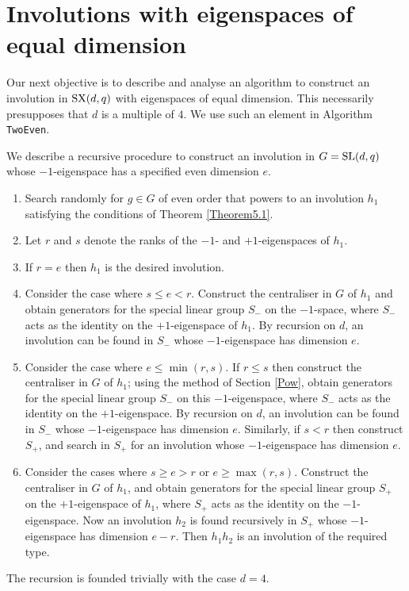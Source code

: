 \documentclass[12pt]{article}
\def\SL{{\rm SL}}
\def\SX{{\rm SX}}
\begin{document}
\section{Involutions with eigenspaces of equal dimension}\label{Equal}
Our next objective is to describe and analyse an algorithm 
to construct an involution in
$\SX(d,q)$ with eigenspaces of equal dimension. This necessarily
presupposes that $d$ is a multiple of $4$. 
We use such an element in Algorithm {\tt TwoEven}. 

We describe a recursive procedure to construct an 
involution in $G=\SL(d, q)$ whose $-1$-eigenspace has a specified 
even dimension $e$. 

\begin{enumerate}
\item 
Search randomly for $g \in G$ of even order
that powers to an involution $h_1$
satisfying the conditions of Theorem \ref{Theorem5.1}.

\item Let $r$ and $s$ denote the ranks of the 
$-1$- and $+1$-eigenspaces of $h_1$.

\item If $r = e$ then $h_1$ is the desired involution.
 
\item 
Consider the case where $s \leq e < r$.
Construct the centraliser in $G$ of  $h_1$ and 
obtain generators for the special linear group
$S_-$ on the $-1$-space, where $S_-$ acts as the identity on the
$+1$-eigenspace of $h_1$. 
By recursion on $d$, an involution 
can be found in $S_-$ whose $-1$-eigenspace    
has dimension $e$. 

\item 
Consider the case where $e \leq \min(r, s)$.
If $r \leq s$ then 
construct the centraliser in $G$ of  $h_1$; 
using the method of Section \ref{Pow}, obtain 
generators for the special linear group
$S_-$ on this $-1$-eigenspace,
where $S_-$ acts as the identity on the $+1$-eigenspace.
By recursion on $d$, an involution 
can be found in $S_-$ whose $-1$-eigenspace    
has dimension $e$. 
Similarly, if $s < r$ then construct $S_+$,
and search in $S_+$ for an involution
whose $-1$-eigenspace has dimension $e$. 

\item 
Consider the cases where $s \geq e > r$ or $e \geq \max(r, s)$.
Construct the centraliser in $G$ of $h_1$, and obtain generators
for the special linear group $S_+$ on the $+1$-eigenspace of $h_1$,
where $S_+$ acts as the identity on the $-1$-eigenspace.
Now an involution $h_2$ is found recursively in
$S_+$ whose $-1$-eigenspace has dimension $e-r$. 
Then $h_1h_2$ is an involution of the required type. 

\end{enumerate}
The recursion is founded trivially with the case $d=4$.
\end{document}
